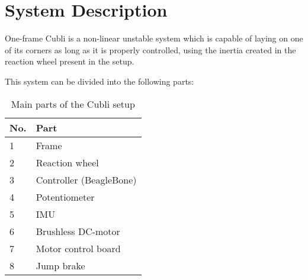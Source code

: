 \chapter{System Description}
One-frame Cubli is a non-linear unstable system which is capable of laying on one of its corners as long as it is properly controlled, using  the inertia created in the reaction wheel present in the setup.

This system can be divided into the following parts:  

\begin{table}[H]
	\begin{tabular}{|l|p{4.5cm}|}
		\hline %
		\textbf{No.} &\textbf{Part} 			\\
		\hline %
		1            & Frame           			\\
		\hline %
		2            & Reaction wheel      		\\
		\hline %
		3            & Controller (BeagleBone)  \\
		\hline %
		4            & Potentiometer			\\
		\hline %
		5            &  IMU          			\\
		\hline %
		6            & Brushless DC-motor   	\\
		\hline %
		7            & Motor control board     	\\
		\hline %
		8            & Jump brake		    	\\
		\hline %
	\end{tabular}
	\caption{Main parts of the Cubli setup \label{TableAAUCubliComponent}}
\end{table}


